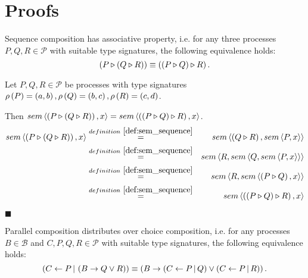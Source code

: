 \chapter{Proofs}
\label{chp:proofs}

\begin{theorem}
\label{thm:associativity_sequence}
Sequence composition has associative property, i.e. for any three processes $P, Q, R \in \mathcal{P}$ with suitable type signatures, the following equivalence holds:
\begin{equation*}
  \left( P \triangleright \left( Q \triangleright R \right) \right) \equiv \left( \left( P \triangleright Q \right) \triangleright R \right).
\end{equation*}
\end{theorem}

\begin{myproof}
Let $P, Q, R \in \mathcal{P}$ be processes with type signatures $\rho \left( P \right) = \left( a, b \right), \rho \left( Q \right) = \left( b, c \right), \rho \left( R \right) = \left( c, d \right)$.

Then $sem \left\langle \left( P \triangleright \left( Q \triangleright R \right) \right), x \right\rangle = sem \left\langle \left( \left( P \triangleright Q \right) \triangleright R \right), x \right\rangle$.
\begin{eqnarray*}
  \sem{\sequence{P}{\sequence{Q}{R}}}{x} & \overset{\defref{def:sem_sequence}}{=} & \sem{\sequence{Q}{R}}{\sem{P}{x}} \\
                                         & \overset{\defref{def:sem_sequence}}{=} & \sem{R}{\sem{Q}{\sem{P}{x}}} \\
                                         & \overset{\defref{def:sem_sequence}}{=} & \sem{R}{\sem{\sequence{P}{Q}}{x}} \\
                                         & \overset{\defref{def:sem_sequence}}{=} & \sem{\sequence{\sequence{P}{Q}}{R}}{x}
\end{eqnarray*}

\hfill$\blacksquare$
\end{myproof}

\begin{theorem}
\label{thm:distributivity_parallel_choice}
Parallel composition distributes over choice composition, i.e. for any processes $B \in \mathcal{B}$ and $C, P, Q, R \in \mathcal{P}$ with suitable type signatures, the following equivalence holds:
\begin{equation*}
  \left( C \gets P \, | \, \left( B \to Q \vee R \right) \right) \equiv \left( B \to \left( C \gets P \, | \, Q \right) \vee \left( C \gets P \, | \, R \right) \right).
\end{equation*}
\end{theorem}

